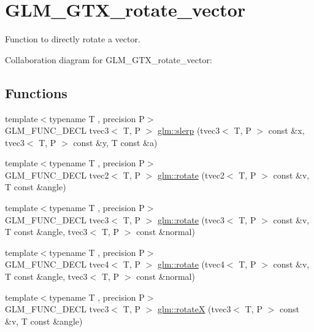 \hypertarget{group__gtx__rotate__vector}{\section{G\-L\-M\-\_\-\-G\-T\-X\-\_\-rotate\-\_\-vector}
\label{group__gtx__rotate__vector}
}


Function to directly rotate a vector.  


Collaboration diagram for G\-L\-M\-\_\-\-G\-T\-X\-\_\-rotate\-\_\-vector\-:
\subsection*{Functions}
\begin{DoxyCompactItemize}
\item 
{\footnotesize template$<$typename T , precision P$>$ }\\G\-L\-M\-\_\-\-F\-U\-N\-C\-\_\-\-D\-E\-C\-L tvec3$<$ T, P $>$ \hyperlink{group__gtx__rotate__vector_gafc9ab3101c3f3799f3d5d6d9d3baac09}{glm\-::slerp} (tvec3$<$ T, P $>$ const \&x, tvec3$<$ T, P $>$ const \&y, T const \&a)
\item 
{\footnotesize template$<$typename T , precision P$>$ }\\G\-L\-M\-\_\-\-F\-U\-N\-C\-\_\-\-D\-E\-C\-L tvec2$<$ T, P $>$ \hyperlink{group__gtx__rotate__vector_ga9bff444fb191e2e089a906b899cd033d}{glm\-::rotate} (tvec2$<$ T, P $>$ const \&v, T const \&angle)
\item 
{\footnotesize template$<$typename T , precision P$>$ }\\G\-L\-M\-\_\-\-F\-U\-N\-C\-\_\-\-D\-E\-C\-L tvec3$<$ T, P $>$ \hyperlink{group__gtx__rotate__vector_ga526b6f8995bc0946aa1a04e9297de7c6}{glm\-::rotate} (tvec3$<$ T, P $>$ const \&v, T const \&angle, tvec3$<$ T, P $>$ const \&normal)
\item 
{\footnotesize template$<$typename T , precision P$>$ }\\G\-L\-M\-\_\-\-F\-U\-N\-C\-\_\-\-D\-E\-C\-L tvec4$<$ T, P $>$ \hyperlink{group__gtx__rotate__vector_gaf4d59dd2f668f9ffb38048055d1316bd}{glm\-::rotate} (tvec4$<$ T, P $>$ const \&v, T const \&angle, tvec3$<$ T, P $>$ const \&normal)
\item 
{\footnotesize template$<$typename T , precision P$>$ }\\G\-L\-M\-\_\-\-F\-U\-N\-C\-\_\-\-D\-E\-C\-L tvec3$<$ T, P $>$ \hyperlink{group__gtx__rotate__vector_ga0c2dc9f8507bffcbb957db9818b18508}{glm\-::rotate\-X} (tvec3$<$ T, P $>$ const \&v, T const \&angle)

\end{DoxyCompactItemize}
